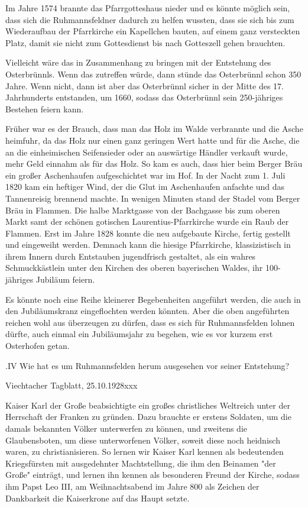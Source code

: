 \documentclass{book}
\begin{document}
Im Jahre 1574 brannte das Pfarrgotteshaus nieder und es könnte möglich sein,
dass sich die Ruhmannsfeldner dadurch zu helfen wussten, dass sie sich bis zum
Wiederaufbau der Pfarrkirche ein Kapellchen bauten, auf einem ganz versteckten
Platz, damit sie nicht zum Gottesdienst bis nach Gotteszell gehen brauchten.

Vielleicht wäre das in Zusammenhang zu bringen mit der Entstehung des
Osterbrünnls. Wenn das zutreffen würde, dann stünde das Osterbrünnl schon 350
Jahre. Wenn nicht, dann ist aber das Osterbrünnl sicher in der Mitte des 17.
Jahrhunderts entstanden, um 1660, sodass das Osterbrünnl sein 250-jähriges
Bestehen feiern kann.

Früher war es der Brauch, dass man das Holz im Walde verbrannte und die Asche
heimfuhr, da das Holz nur einen ganz geringen Wert hatte und für die Asche, die
an die einheimischen Seifensieder oder an auswärtige Händler verkauft wurde,
mehr Geld einnahm als für das Holz. So kam es auch, dass hier beim Berger Bräu
ein großer Aschenhaufen aufgeschichtet war im Hof. In der Nacht zum 1. Juli 1820
kam ein heftiger Wind, der die Glut im Aschenhaufen anfachte und das
Tannenreisig brennend machte. In wenigen Minuten stand der Stadel vom Berger
Bräu in Flammen. Die halbe Marktgasse von der Bachgasse bis zum oberen Markt
samt der schönen gotischen Laurentius-Pfarrkirche wurde ein Raub der Flammen.
Erst im Jahre 1828 konnte die neu aufgebaute Kirche, fertig gestellt und
eingeweiht werden. Demnach kann die hiesige Pfarrkirche, klassizistisch in ihrem
Innern durch Entstauben jugendfrisch gestaltet, als ein wahres Schmuckkästlein
unter den Kirchen des oberen bayerischen Waldes, ihr 100-jähriges Jubiläum
feiern.

Es könnte noch eine Reihe kleinerer Begebenheiten angeführt werden, die auch in
den Jubiläumskranz eingeflochten werden könnten. Aber die oben angeführten
reichen wohl aus überzeugen zu dürfen, dass es sich für Ruhmannsfelden lohnen
dürfte, auch einmal ein Jubiläumsjahr zu begehen, wie es vor kurzem erst
Osterhofen getan.

.IV Wie hat es um Ruhmannsfelden herum ausgesehen vor seiner Entstehung?

Viechtacher Tagblatt, 25.10.1928xxx

Kaiser Karl der Große beabsichtigte ein großes christliches Weltreich unter der
Herrschaft der Franken zu gründen. Dazu brauchte er erstens Soldaten, um die
damals bekannten Völker unterwerfen zu können, und zweitens die Glaubensboten,
um diese unterworfenen Völker, soweit diese noch heidnisch waren, zu
christianisieren. So lernen wir Kaiser Karl kennen als bedeutenden Kriegsfürsten
mit ausgedehnter Machtstellung, die ihm den Beinamen "der Große" einträgt, und
lernen ihn kennen als besonderen Freund der Kirche, sodass ihm Papst Leo III, am
Weihnachtsabend im Jahre 800 als Zeichen der Dankbarkeit die Kaiserkrone auf das
Haupt setzte.
\end{document}
